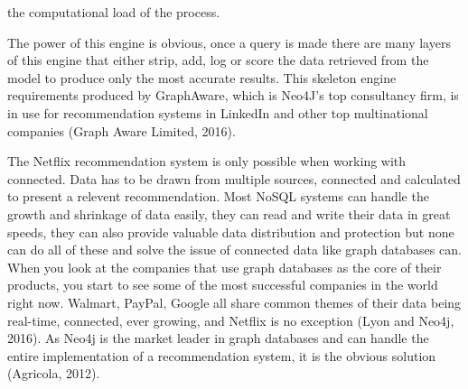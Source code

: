 \documentclass[a4paper]{article}
\begin{document}
the computational load of the process.

The power of this engine is obvious, once a query is made there are many layers of this engine that either strip, add, log or score the data retrieved from the model to produce only the most accurate results. This skeleton engine requirements produced by GraphAware, which is Neo4J's top consultancy firm, is in use for recommendation systems in LinkedIn and other top multinational companies (Graph Aware Limited, 2016).

The Netflix recommendation system is only possible when working with connected. Data has to be drawn from multiple sources, connected and calculated to present a relevent recommendation. Most NoSQL systems can handle the growth and shrinkage of data easily, they can read and write their data in great speeds, they can also provide valuable data distribution and protection but none can do all of these and solve the issue of connected data like graph databases can. When you look at the companies that use graph databases as the core of their products, you start to see some of the most successful companies in the world right now. Walmart, PayPal, Google all share common themes of their data being real-time, connected, ever growing, and Netflix is no exception (Lyon and Neo4j, 2016). As Neo4j is the market leader in graph databases and can handle the entire implementation of a recommendation system, it is the obvious solution (Agricola, 2012). \par
\end{document}
